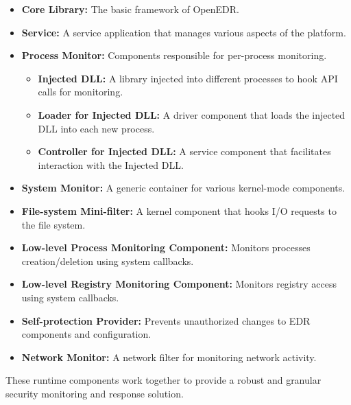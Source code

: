 \documentclass{article}
\begin{document}
\begin{itemize}
    \item \textbf{Core Library:} The basic framework of OpenEDR.
    \item \textbf{Service:} A service application that manages various aspects of the platform.
    \item \textbf{Process Monitor:} Components responsible for per-process monitoring.
        \begin{itemize}
            \item \textbf{Injected DLL:} A library injected into different processes to hook API calls for monitoring.
            \item \textbf{Loader for Injected DLL:} A driver component that loads the injected DLL into each new process.
            \item \textbf{Controller for Injected DLL:} A service component that facilitates interaction with the Injected DLL.
        \end{itemize}
    \item \textbf{System Monitor:} A generic container for various kernel-mode components.
    \item \textbf{File-system Mini-filter:} A kernel component that hooks I/O requests to the file system.
    \item \textbf{Low-level Process Monitoring Component:} Monitors processes creation/deletion using system callbacks.
    \item \textbf{Low-level Registry Monitoring Component:} Monitors registry access using system callbacks.
    \item \textbf{Self-protection Provider:} Prevents unauthorized changes to EDR components and configuration.
    \item \textbf{Network Monitor:} A network filter for monitoring network activity.
\end{itemize}

These runtime components work together to provide a robust and granular security monitoring and response solution.
\end{document}
